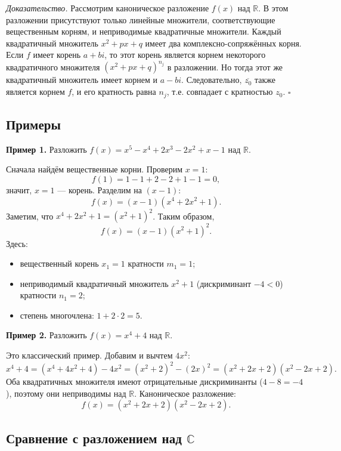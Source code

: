 \documentclass[a4paper,12pt]{article}
\theoremstyle{definition}
\theoremstyle{plain}
\theoremstyle{remark}
\begin{document}
	\medskip
	\textit{Доказательство.}
	Рассмотрим каноническое разложение \(f(x)\) над \(\mathbb{R}\). В этом разложении присутствуют только линейные множители, соответствующие вещественным корням, и неприводимые квадратичные множители. Каждый квадратичный множитель \(x^2 + px + q\) имеет два комплексно-сопряжённых корня. Если \(f\) имеет корень \(a + bi\), то этот корень является корнем некоторого квадратичного множителя \((x^2 + px + q)^{n_j}\) в разложении. Но тогда этот же квадратичный множитель имеет корнем и \(a - bi\). Следовательно, \(\overline{z_0}\) также является корнем \(f\), и его кратность равна \(n_j\), т.е. совпадает с кратностью \(z_0\). \hfill \(\square\)
	
	\subsection{Примеры}
	
	\textbf{Пример 1.} Разложить \(f(x) = x^5 - x^4 + 2x^3 - 2x^2 + x - 1\) над \(\mathbb{R}\).
	
	Сначала найдём вещественные корни. Проверим \(x = 1\):
	\[
	f(1) = 1 - 1 + 2 - 2 + 1 - 1 = 0,
	\]
	значит, \(x = 1\) — корень. Разделим на \((x - 1)\):
	\[
	f(x) = (x - 1)(x^4 + 2x^2 + 1).
	\]
	Заметим, что \(x^4 + 2x^2 + 1 = (x^2 + 1)^2\). Таким образом,
	\[
	f(x) = (x - 1)(x^2 + 1)^2.
	\]
	Здесь:
	\begin{itemize}
		\item вещественный корень \(x_1 = 1\) кратности \(m_1 = 1\);
		\item неприводимый квадратичный множитель \(x^2 + 1\) (дискриминант \(-4 < 0\)) кратности \(n_1 = 2\);
		\item степень многочлена: \(1 + 2 \cdot 2 = 5\).
	\end{itemize}
	
	\textbf{Пример 2.} Разложить \(f(x) = x^4 + 4\) над \(\mathbb{R}\).
	
	Это классический пример. Добавим и вычтем \(4x^2\):
	\[
	x^4 + 4 = (x^4 + 4x^2 + 4) - 4x^2 = (x^2 + 2)^2 - (2x)^2 = (x^2 + 2x + 2)(x^2 - 2x + 2).
	\]
	Оба квадратичных множителя имеют отрицательные дискриминанты (\(4 - 8 = -4\)), поэтому они неприводимы над \(\mathbb{R}\). Каноническое разложение:
	\[
	f(x) = (x^2 + 2x + 2)(x^2 - 2x + 2).
	\]
	
	\subsection{Сравнение с разложением над \(\mathbb{C}\)}
	
\end{document}
